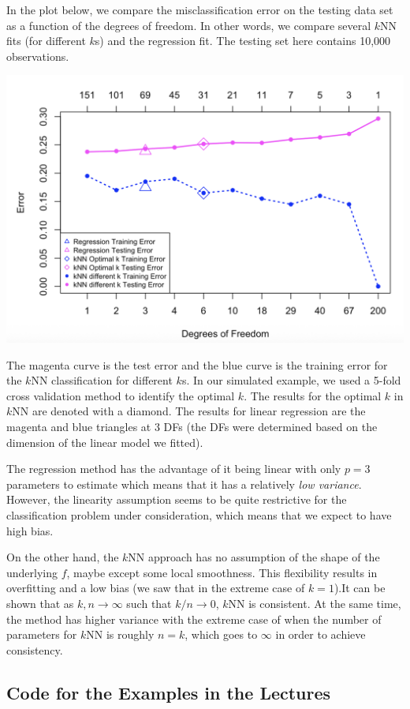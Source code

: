 \documentclass[
]{book}
\begin{document}
In the plot below, we compare the misclassification error on the testing data set as a function of the degrees of freedom. In other words, we compare several \(k\)NN fits (for different \(k\)s) and the regression fit. The testing set here contains 10,000 observations.

\begin{center}\includegraphics[width=0.7\linewidth]{images/week1/traintesterror} \end{center}

The magenta curve is the test error and the blue curve is the training error for the \(k\)NN classification for different \(k\)s. In our simulated example, we used a 5-fold cross validation method to identify the optimal \(k\). The results for the optimal \(k\) in \(k\)NN are denoted with a diamond. The results for linear regression are the
magenta and blue triangles at 3 DFs (the DFs were determined based on the dimension of the linear model we fitted).

The regression method has the advantage of it being linear with only \(p=3\) parameters to estimate which means that it has a relatively \emph{low variance}. However, the linearity assumption seems to be quite restrictive for the classification problem under consideration, which means that we expect to have high bias.

On the other hand, the \(k\)NN approach has no assumption of the shape of the underlying \(f\), maybe except some local smoothness. This flexibility results in overfitting and a low bias (we saw that in the extreme case of \(k=1\)).It can be shown that as \(k, n \rightarrow \infty\) such that \(k/n \rightarrow 0\), \(k\)NN is consistent. At the same time, the method has higher variance with the extreme case of when the number of parameters for \(k\)NN is roughly \(n=k\), which goes to \(\infty\) in order to achieve consistency.

\subsection{Code for the Examples in the Lectures}\label{code-for-the-examples-in-the-lectures}
\end{document}
